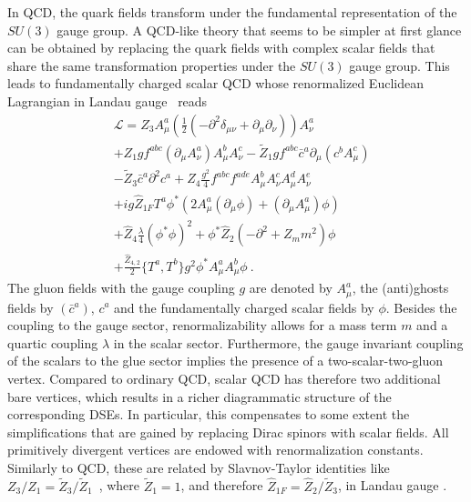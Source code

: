 \documentclass[final,twocolumn,merge,sort&compress]{elsarticle}
\begin{document}
In QCD, the quark fields transform under the fundamental
representation of the $SU(3)$ gauge group. A
QCD-like theory that seems to be simpler at first glance can be
obtained by replacing the quark fields with complex scalar fields that
share the same transformation properties under the $SU(3)$ gauge
group. This leads to fundamentally charged scalar QCD whose
renormalized Euclidean Lagrangian in Landau
gauge~\cite{Fister:2010ah,Fister:2010yw} reads
\begin{equation}
\label{eq:action}
\begin{split}
& \mathcal L = Z_3A^a_\mu\left(\frac{1}{2}\left(-\partial^2 \delta_{\mu\nu}+\partial_\mu\partial_\nu\right)\right)A^a_\nu \\
 & + Z_1gf^{abc}\left(\partial_\mu A^a_\nu\right)A^{b}_\mu A^{c}_\nu 
   - \tilde{Z}_1g f^{abc}\bar{c}^a\partial_\mu(c^bA^c_\mu) \\
 & - \tilde{Z}_3\bar{c}^a\partial^2 c^a 
   + Z_4\frac{g^2}{4}f^{abc}f^{ade}A^b_\mu A^c_\nu A^{d}_\mu A^{e}_\nu \\
 & + ig\hat{Z}_{1F}T^a \phi^*\left(2A^a_\mu(\partial_\mu\phi)+(\partial_\mu A^a_\mu)\phi\right) \\
 & + \hat{Z}_4\frac{\lambda}{4}(\phi^*\phi)^2 + \phi^*\hat{Z}_2\left(-\partial^2+Z_m m^2\right)\phi \\
 & + \frac{\hat{Z}_{4,2}}{2}\{T^a,T^b\}g^2 \phi^* A^a_\mu A^b_\mu\phi \ .
\end{split}
\end{equation}
The gluon fields with the gauge coupling $g$ are denoted by $A^a_\mu$,
the (anti)ghosts fields by $(\bar{c}^a)$, $c^a$ and the fundamentally
charged scalar fields by $\phi$. Besides the coupling to the gauge
sector, renormalizability allows for a mass term $m$ and a quartic
coupling $\lambda$ in the scalar sector. Furthermore, the gauge
invariant coupling of the scalars to the glue sector implies the
presence of a two-scalar-two-gluon vertex. Compared to ordinary QCD,
scalar QCD has therefore two additional bare vertices, which results
in a richer diagrammatic structure of the corresponding DSEs. In particular,
this compensates to some extent the simplifications that are gained by replacing
Dirac spinors with scalar fields.
All primitively divergent vertices are endowed with renormalization
constants. Similarly to QCD, these are related by Slavnov-Taylor
identities like
$Z_3/Z_1 = \tilde{Z}_3/\tilde{Z}_1$~\cite{Marciano:1977su}, where
$\tilde{Z}_1=1$, and therefore $\hat{Z}_{1F} =\hat{Z}_2/\tilde{Z}_3$,
in Landau gauge \cite{Taylor:1971ff}.
\end{document}
